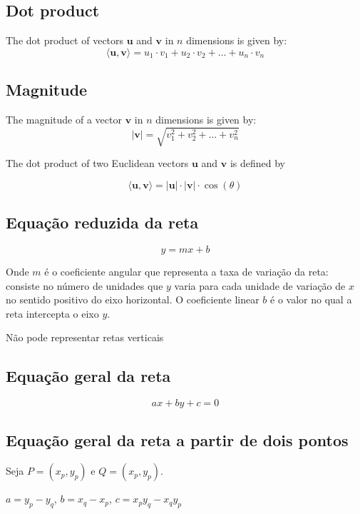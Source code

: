 \subsection{Dot product}
The dot product of vectors $\mathbf{u}$ and $\mathbf{v}$ in $n$ dimensions is given by:
\[
\langle \mathbf{u}, \mathbf{v} \rangle = u_1 \cdot v_1 + u_2 \cdot v_2 + \ldots + u_n \cdot v_n
\]

\subsection{Magnitude}
The magnitude of a vector $\mathbf{v}$ in $n$ dimensions is given by:
\[
|\mathbf{v}| = \sqrt{v_1^2 + v_2^2 + \ldots + v_n^2}
\]

The dot product of two Euclidean vectors $\mathbf{u}$ and $\mathbf{v}$ is defined by

\[
\langle \mathbf{u}, \mathbf{v} \rangle = |\mathbf{u}| \cdot |\mathbf{v}| \cdot \cos(\theta)
\]

\subsection{Equação reduzida da reta}

\begin{equation}
    y = mx + b
\end{equation}

Onde $m$ é o coeficiente angular que representa a taxa de variação da reta: consiste no número de
unidades que $y$ varia para cada unidade de variação de $x$ no sentido positivo do eixo
horizontal. O coeficiente linear $b$ é o valor no qual a reta intercepta o eixo $y$.

Não pode representar retas verticais

\subsection{Equação geral da reta}

\begin{equation}
    ax + by + c = 0
\end{equation}

\subsection{Equação geral da reta a partir de dois pontos}

Seja $P = (x_p, y_p)$ e $Q = (x_p, y_p)$.

$a = y_p - y_q$, $b = x_q-x_p$, $c = x_p y_q - x_q y_p$


